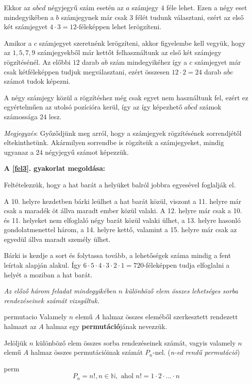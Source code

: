 \begin{solution}
Ekkor az $\overline{abcd}$ négyjegyű szám esetén az $a$ számjegy
$4$ féle lehet. Ezen a négy eset mindegyikében a $b$ számjegynek
már csak 3 félét tudunk választani, ezért az első két számjegyet $4\cdot3=12$-féleképpen
lehet lerögzíteni.

Amikor a $c$ számjegyet szeretnénk lerögzíteni, akkor figyelembe
kell vegyük, hogy az $1,5,7,9$ számjegyekből már kettőt felhasználtunk
az első két számjegy rögzítésénél. Az előbbi $12$ darab $\overline{ab}$
szám mindegyikéhez így a $c$ számjegyet már csak kétféleképpen tudjuk
megválasztani, ezért összesen $12\cdot2=24$ darab $\overline{abc}$
számot tudok képezni.

A négy számjegy közül a rögzítéshez még csak egyet nem használtunk
fel, ezért ez egyértelműen az utolsó pozícióra kerül, így az így képezhető
$\overline{abcd}$ számok számossága $24$ lesz.

\textit{Megjegyzés}: Győződjünk meg arról, hogy a számjegyek rögzítésének
sorrendjétől eltekinthetünk. Akármilyen sorrendbe is rögzítsük a számjegyeket,
mindig ugyanaz a $24$ négyjegyű számot képezzük.

{\bf A \ref{fel3}. gyakorlat megoldása:}

Feltételezzük, hogy a hat barát a helyüket balról jobbra egyesével
foglalják el.

A 10. helyre kezdetben bárki leülhet a hat barát közül, viszont a
11. helyre már csak a maradék öt állva maradt ember közül valaki.
A 12. helyre már csak a 10. és 11. helyeket nem elfoglaló négy barát
közül valaki ülhet, a 13. helyre hasonló gondolatmenettel három, a
14. helyre kettő, valamint a 15. helyre már csak az egyedül állva
maradt személy ülhet.

Bárki is kezdje a sort és folytassa tovább, a lehetőségek száma mindig
a fent leírtak alapján alakul. Így $6\cdot5\cdot4\cdot3\cdot2\cdot1=720$-féleképpen
tudja elfoglalni a helyét a moziban a hat barát. 
\end{solution}
\textit{Az előző három feladat mindegyikében $n$ különböző elem összes
lehetséges sorba rendezéseinek számát vizsgáltuk.}

\begin{definition}{permutacio}
Valamely $n$ elemű $A$ halmaz összes eleméből szerkesztett rendezett
halmazt az $A$ halmaz egy \textbf{permutáció}jának nevezzük.
\end{definition}

Jelöljük $n$ különböző elem összes sorba rendezéseinek számát, vagyis
valamely $n$ elemű $A$ halmaz összes permutációinak számát \textbf{$P_{n}$}-nel.
(\textit{n-ed rendű permutáció})
\begin{theorem}{perm}
\[
P_{n}=n!,n\in\mathbb{N},\text{ ahol }n!=1\cdot2\cdot\ldots\cdot n
\]
\end{theorem}

